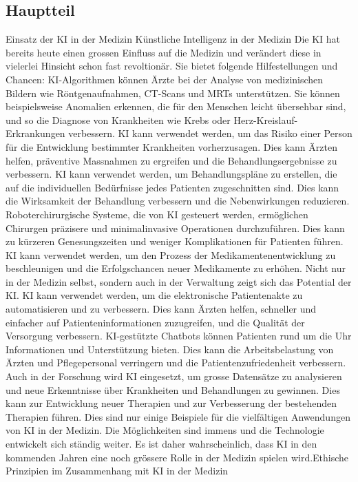 \documentclass{article}
\begin{document}
\subsection{Hauptteil}
Einsatz der KI in der Medizin
Künstliche Intelligenz in der Medizin
Die KI hat bereits heute einen grossen Einfluss auf die Medizin und verändert diese in vielerlei Hinsicht schon fast revoltionär. Sie bietet folgende Hilfestellungen und Chancen:
KI-Algorithmen können Ärzte bei der Analyse von medizinischen Bildern wie Röntgenaufnahmen, CT-Scans und MRTs unterstützen. Sie können beispielsweise Anomalien erkennen, die für den Menschen leicht übersehbar sind, und so die Diagnose von Krankheiten wie Krebs oder Herz-Kreislauf-Erkrankungen verbessern.
KI kann verwendet werden, um das Risiko einer Person für die Entwicklung bestimmter Krankheiten vorherzusagen. Dies kann Ärzten helfen, präventive Massnahmen zu ergreifen und die Behandlungsergebnisse zu verbessern.
KI kann verwendet werden, um Behandlungspläne zu erstellen, die auf die individuellen Bedürfnisse jedes Patienten zugeschnitten sind. Dies kann die Wirksamkeit der Behandlung verbessern und die Nebenwirkungen reduzieren.
Roboterchirurgische Systeme, die von KI gesteuert werden, ermöglichen Chirurgen präzisere und minimalinvasive Operationen durchzuführen. Dies kann zu kürzeren Genesungszeiten und weniger Komplikationen für Patienten führen.
KI kann verwendet werden, um den Prozess der Medikamentenentwicklung zu beschleunigen und die Erfolgschancen neuer Medikamente zu erhöhen.
Nicht nur in der Medizin selbst, sondern auch in der Verwaltung zeigt sich das Potential der KI.
KI kann verwendet werden, um die elektronische Patientenakte zu automatisieren und zu verbessern. Dies kann Ärzten helfen, schneller und einfacher auf Patienteninformationen zuzugreifen, und die Qualität der Versorgung verbessern.
KI-gestützte Chatbots können Patienten rund um die Uhr Informationen und Unterstützung bieten. Dies kann die Arbeitsbelastung von Ärzten und Pflegepersonal verringern und die Patientenzufriedenheit verbessern.
Auch in der Forschung wird KI eingesetzt, um grosse Datensätze zu analysieren und neue Erkenntnisse über Krankheiten und Behandlungen zu gewinnen. Dies kann zur Entwicklung neuer Therapien und zur Verbesserung der bestehenden Therapien führen.
Dies sind nur einige Beispiele für die vielfältigen Anwendungen von KI in der Medizin. Die Möglichkeiten sind immens und die Technologie entwickelt sich ständig weiter. Es ist daher wahrscheinlich, dass KI in den kommenden Jahren eine noch grössere Rolle in der Medizin spielen wird.Ethische Prinzipien im Zusammenhang mit KI in der Medizin
\end{document}
